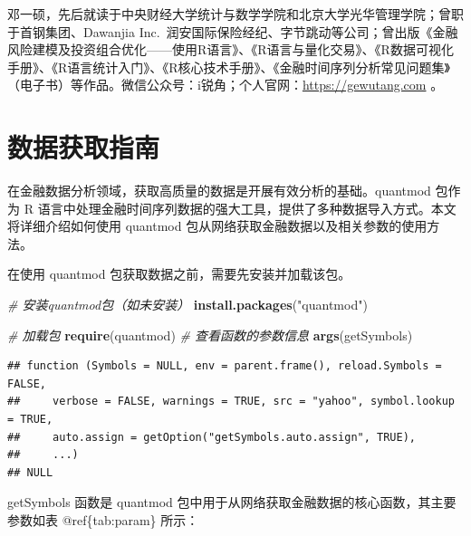 \documentclass[]{ctexbook}
\newenvironment{Shaded}{\begin{snugshade}}{\end{snugshade}}
\newcommand{\CommentTok}[1]{\textcolor[rgb]{0.56,0.35,0.01}{\textit{#1}}}
\newcommand{\FunctionTok}[1]{\textcolor[rgb]{0.13,0.29,0.53}{\textbf{#1}}}
\newcommand{\NormalTok}[1]{#1}
\newcommand{\StringTok}[1]{\textcolor[rgb]{0.31,0.60,0.02}{#1}}
\begin{document}
邓一硕，先后就读于中央财经大学统计与数学学院和北京大学光华管理学院；曾职于首钢集团、Dawanjia Inc.~润安国际保险经纪、字节跳动等公司；曾出版《金融风险建模及投资组合优化------使用R语言》、《R语言与量化交易》、《R数据可视化手册》、《R语言统计入门》、《R核心技术手册》、《金融时间序列分析常见问题集》（电子书）等作品。微信公众号：i锐角；个人官网：\url{https://gewutang.com} 。

\mainmatter

\chapter{数据获取指南}\label{data}

在金融数据分析领域，获取高质量的数据是开展有效分析的基础。quantmod 包作为 R 语言中处理金融时间序列数据的强大工具，提供了多种数据导入方式。本文将详细介绍如何使用 quantmod 包从网络获取金融数据以及相关参数的使用方法。

在使用 quantmod 包获取数据之前，需要先安装并加载该包。

\begin{Shaded}
\begin{Highlighting}[]
\CommentTok{\# 安装quantmod包（如未安装）}
\FunctionTok{install.packages}\NormalTok{(}\StringTok{"quantmod"}\NormalTok{)}
\end{Highlighting}
\end{Shaded}

\begin{Shaded}
\begin{Highlighting}[]
\CommentTok{\# 加载包}
\FunctionTok{require}\NormalTok{(quantmod)}
\CommentTok{\# 查看函数的参数信息}
\FunctionTok{args}\NormalTok{(getSymbols)}
\end{Highlighting}
\end{Shaded}

\begin{verbatim}
## function (Symbols = NULL, env = parent.frame(), reload.Symbols = FALSE, 
##     verbose = FALSE, warnings = TRUE, src = "yahoo", symbol.lookup = TRUE, 
##     auto.assign = getOption("getSymbols.auto.assign", TRUE), 
##     ...) 
## NULL
\end{verbatim}

getSymbols 函数是 quantmod 包中用于从网络获取金融数据的核心函数，其主要参数如表 @ref\{tab:param\} 所示：
\end{document}
